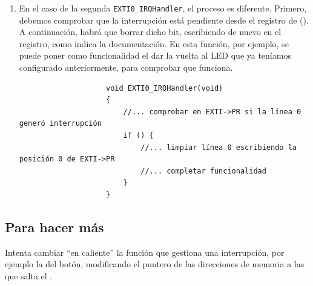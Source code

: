 \documentclass[../main.tex]{subfiles}
\begin{document}
\begin{enumerate}
                \begin{lstlisting}
                    void USART6_IRQHandler(void)
                    {
                        //... completar comprobar si el flag de interrupción está activo
                        if () {
                            //... completar leer el byte                            
                        } 
                    }
                \end{lstlisting}
            \item En el caso de la segunda \lstinline|EXTI0_IRQHandler|, el proceso es diferente. Primero, debemos comprobar que la interrupción está pendiente desde el registro  de  (\REFMAN[10.9.6]). A continuación, habrá que borrar dicho bit, escribiendo de nuevo en el registro, como indica la documentación. En esta función, por ejemplo, se puede poner como funcionalidad el dar la vuelta al LED que ya teníamos configurado anteriormente, para comprobar que funciona.
            
                \begin{lstlisting}
                    void EXTI0_IRQHandler(void)
                    {
                        //... comprobar en EXTI->PR si la línea 0 generó interrupción
                        if () {
                            //... limpiar línea 0 escribiendo la posición 0 de EXTI->PR
                            //... completar funcionalidad
                        }
                    }    
                \end{lstlisting}
                
        \end{enumerate}


    \subsection{Para hacer más}

        Intenta cambiar ``en caliente'' la función que gestiona una interrupción, por ejemplo la del botón, modificando el puntero de las direcciones de memoria a las que salta el .
\end{document}
